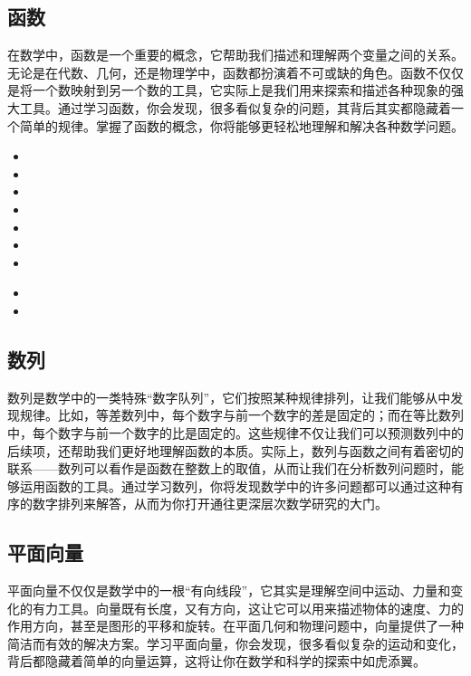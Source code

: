 \subsection{函数}

在数学中，函数是一个重要的概念，它帮助我们描述和理解两个变量之间的关系。无论是在代数、几何，还是物理学中，函数都扮演着不可或缺的角色。函数不仅仅是将一个数映射到另一个数的工具，它实际上是我们用来探索和描述各种现象的强大工具。通过学习函数，你会发现，很多看似复杂的问题，其背后其实都隐藏着一个简单的规律。掌握了函数的概念，你将能够更轻松地理解和解决各种数学问题。
\begin{itemize}
\item {}
\item {}
\item {}
\item {}
\item {}
\item {}
\item {}
\end{itemize}

\begin{itemize}
\item {}
\item {}
\end{itemize}

\subsection{数列}

数列是数学中的一类特殊“数字队列”，它们按照某种规律排列，让我们能够从中发现规律。比如，等差数列中，每个数字与前一个数字的差是固定的；而在等比数列中，每个数字与前一个数字的比是固定的。这些规律不仅让我们可以预测数列中的后续项，还帮助我们更好地理解函数的本质。实际上，数列与函数之间有着密切的联系——数列可以看作是函数在整数上的取值，从而让我们在分析数列问题时，能够运用函数的工具。通过学习数列，你将发现数学中的许多问题都可以通过这种有序的数字排列来解答，从而为你打开通往更深层次数学研究的大门。

\subsection{平面向量}

平面向量不仅仅是数学中的一根“有向线段”，它其实是理解空间中运动、力量和变化的有力工具。向量既有长度，又有方向，这让它可以用来描述物体的速度、力的作用方向，甚至是图形的平移和旋转。在平面几何和物理问题中，向量提供了一种简洁而有效的解决方案。学习平面向量，你会发现，很多看似复杂的运动和变化，背后都隐藏着简单的向量运算，这将让你在数学和科学的探索中如虎添翼。

